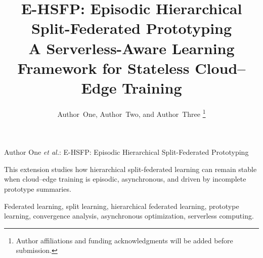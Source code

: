\documentclass[journal]{IEEEtai}
\begin{document}
\title{E-HSFP: Episodic Hierarchical Split-Federated Prototyping\\
A Serverless-Aware Learning Framework for Stateless Cloud--Edge Training} 


\author{Author~One, Author~Two, and Author~Three%
\thanks{Author affiliations and funding acknowledgments will be added before submission.}}

{Author One \MakeLowercase{\textit{et al.}}: E-HSFP: Episodic Hierarchical Split-Federated Prototyping}

\maketitle

\begin{IEEEImpStatement}
This extension studies how hierarchical split-federated learning can remain stable when cloud--edge training is episodic, asynchronous, and driven by incomplete prototype summaries.
\end{IEEEImpStatement}
\begin{IEEEkeywords}
Federated learning, split learning, hierarchical federated learning, prototype learning, convergence analysis, asynchronous optimization, serverless computing.
\end{IEEEkeywords}












\end{document}
